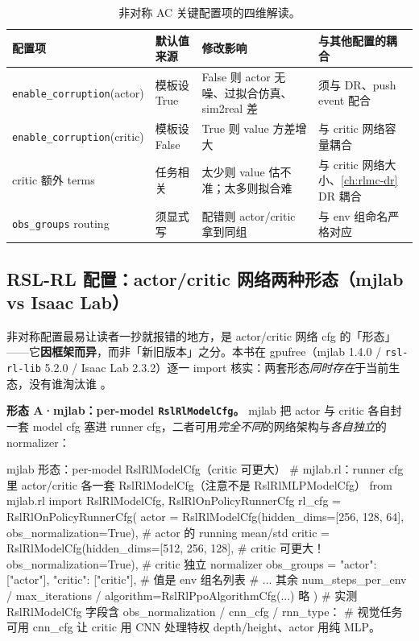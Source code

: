 \begin{table}[H]
\centering
\small
\caption{非对称 AC 关键配置项的四维解读。}
\label{tab:rlmc-priv-cfg4dim}
\begin{tabular}{@{}p{2.7cm}p{2.7cm}p{2.7cm}p{3.4cm}@{}}
\toprule
配置项 & 默认值来源 & 修改影响 & 与其他配置的耦合 \\
\midrule
\texttt{enable\_corruption}(actor) & 模板设 True & False 则 actor 无噪、过拟合仿真、sim2real 差 & 须与 DR、push event 配合 \\
\texttt{enable\_corruption}(critic) & 模板设 False & True 则 value 方差增大 & 与 critic 网络容量耦合 \\
critic 额外 terms & 任务相关 & 太少则 value 估不准；太多则拟合难 & 与 critic 网络大小、\cref{ch:rlmc-dr} DR 耦合 \\
\texttt{obs\_groups} routing & 须显式写 & 配错则 actor/critic 拿到同组 & 与 env 组命名严格对应 \\
\bottomrule
\end{tabular}
\end{table}

\subsection{RSL-RL 配置：actor/critic 网络两种形态（mjlab vs Isaac Lab）}
\label{sec:rlmc-priv-rslrl4}

非对称配置最易让读者一抄就报错的地方，是 actor/critic 网络 cfg 的「形态」——它\textbf{因框架而异}，而非「新旧版本」之分。本书在 gpufree（mjlab 1.4.0 / \verb|rsl-rl-lib| 5.2.0 / Isaac Lab 2.3.2）逐一 import 核实：两套形态\emph{同时存在}于当前生态，没有谁淘汰谁 \cite{schwarke2025rslrl}。

\textbf{形态 A·mjlab：per-model \texttt{RslRlModelCfg}。} mjlab 把 actor 与 critic 各自封一套 model cfg 塞进 runner cfg，二者可用\emph{完全不同}的网络架构与\emph{各自独立}的 normalizer：

\begin{codebox}[Python]{mjlab 形态：per-model RslRlModelCfg（critic 可更大）}
# mjlab.rl：runner cfg 里 actor/critic 各一套 RslRlModelCfg（注意不是 RslRlMLPModelCfg）
from mjlab.rl import RslRlModelCfg, RslRlOnPolicyRunnerCfg
rl_cfg = RslRlOnPolicyRunnerCfg(
    actor  = RslRlModelCfg(hidden_dims=[256, 128, 64],
                           obs_normalization=True),     # actor 的 running mean/std
    critic = RslRlModelCfg(hidden_dims=[512, 256, 128],  # critic 可更大！
                           obs_normalization=True),     # critic 独立 normalizer
    obs_groups = {"actor": ["actor"], "critic": ["critic"]},  # 值是 env 组名列表
    # ... 其余 num_steps_per_env / max_iterations / algorithm=RslRlPpoAlgorithmCfg(...) 略
)
# 实测 RslRlModelCfg 字段含 obs_normalization / cnn_cfg / rnn_type：
#   视觉任务可用 cnn_cfg 让 critic 用 CNN 处理特权 depth/height、actor 用纯 MLP。
\end{codebox}

